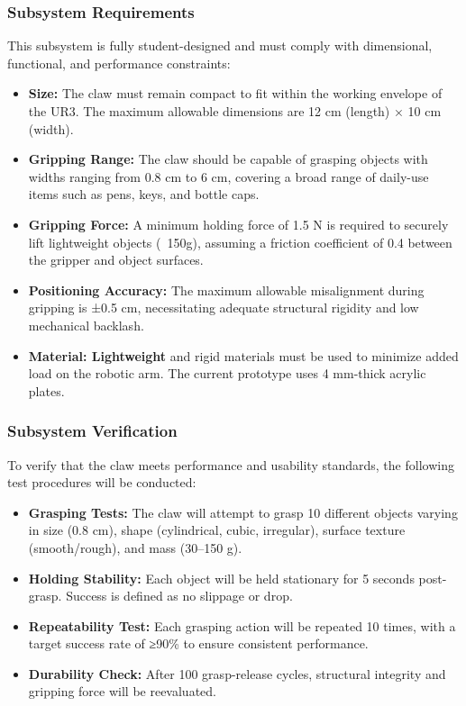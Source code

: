 \documentclass{senior-design}
\begin{document}
\subsubsection*{Subsystem Requirements}
This subsystem is fully student-designed and must comply with dimensional, functional, and performance constraints: 
\begin{itemize}
    \item \textbf{Size:} The claw must remain compact to fit within the working envelope of the UR3. The maximum allowable dimensions are 12 cm (length) × 10 cm (width). 
    \item \textbf{Gripping Range:} The claw should be capable of grasping objects with widths ranging from 0.8 cm to 6 cm, covering a broad range of daily-use items such as pens, keys, and bottle caps. 
    \item \textbf{Gripping Force:} A minimum holding force of 1.5 N is required to securely lift lightweight objects (~150g), assuming a friction coefficient of 0.4 between the gripper and object surfaces. 
    \item \textbf{Positioning Accuracy:} The maximum allowable misalignment during gripping is ±0.5 cm, necessitating adequate structural rigidity and low mechanical backlash. 
    \item \textbf{Material: Lightweight} and rigid materials must be used to minimize added load on the robotic arm. The current prototype uses 4 mm-thick acrylic plates. 
\end{itemize}
\subsubsection*{Subsystem Verification}
To verify that the claw meets performance and usability standards, the following test procedures will be conducted: 
\begin{itemize}
    \item \textbf{Grasping Tests:} The claw will attempt to grasp 10 different objects varying in size (0.8 cm), shape (cylindrical, cubic, irregular), surface texture (smooth/rough), and mass (30–150 g). 
    \item \textbf{Holding Stability:} Each object will be held stationary for 5 seconds post-grasp. Success is defined as no slippage or drop.     
    \item \textbf{Repeatability Test:} Each grasping action will be repeated 10 times, with a target success rate of ≥90\% to ensure consistent performance. 
    \item \textbf{Durability Check:} After 100 grasp-release cycles, structural integrity and gripping force will be reevaluated. 
\end{itemize}
\end{document}
